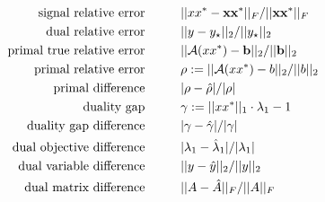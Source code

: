 \begin{subequations}  		\label{Eqn:term_crit-candidate_residuals}
\begin{align}
\text{signal relative error}
	& \hspace{1cm}	||xx^* - \mathbf{x}\mathbf{x}^*||_F / ||\mathbf{x}\mathbf{x}^*||_F \\
\text{dual relative error}
	&	\hspace{1cm} 	||y - y_\star||_2 / ||y_\star||_2 	\\	
\text{primal true relative error}
	& \hspace{1cm} ||{\mathcal A}(xx^*)-\mathbf{b}||_2 / ||\mathbf{b}||_2  \\
\text{primal relative error}
	& \hspace{1cm}	\rho := ||{\mathcal A}(xx^*) - b||_2 / ||b||_2	 \\
\text{primal difference}
	& \hspace{1cm}	|\rho - \hat{\rho} | / | \rho| \\
\text{duality gap}
	& \hspace{1cm}	\gamma := ||xx^*||_1 \cdot \lambda_1 - 1 \\
\text{duality gap difference}
	& \hspace{1cm}	|\gamma - \hat{\gamma} | / |\gamma| \\
\text{dual objective difference}
	& \hspace{1cm}	|\lambda_1 - \hat{\lambda}_1| / |\lambda_1| \\
\text{dual variable difference}
	& \hspace{1cm}	||y- \hat{y}||_2 / ||y||_2 \\
\text{dual matrix difference}
	& \hspace{1cm}	||A - \hat{A}||_F / ||A||_F
\end{align}
\end{subequations}

